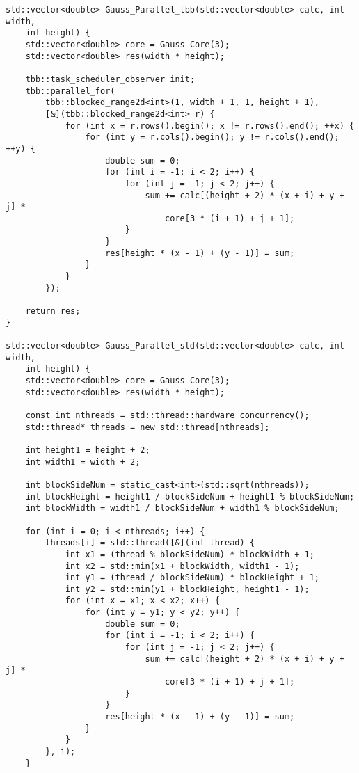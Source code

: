 \documentclass{report}
\begin{document}
\begin{lstlisting}
std::vector<double> Gauss_Parallel_tbb(std::vector<double> calc, int width,
    int height) {
    std::vector<double> core = Gauss_Core(3);
    std::vector<double> res(width * height);

    tbb::task_scheduler_observer init;
    tbb::parallel_for(
        tbb::blocked_range2d<int>(1, width + 1, 1, height + 1),
        [&](tbb::blocked_range2d<int> r) {
            for (int x = r.rows().begin(); x != r.rows().end(); ++x) {
                for (int y = r.cols().begin(); y != r.cols().end(); ++y) {
                    double sum = 0;
                    for (int i = -1; i < 2; i++) {
                        for (int j = -1; j < 2; j++) {
                            sum += calc[(height + 2) * (x + i) + y + j] *
                                core[3 * (i + 1) + j + 1];
                        }
                    }
                    res[height * (x - 1) + (y - 1)] = sum;
                }
            }
        });

    return res;
}

std::vector<double> Gauss_Parallel_std(std::vector<double> calc, int width,
    int height) {
    std::vector<double> core = Gauss_Core(3);
    std::vector<double> res(width * height);

    const int nthreads = std::thread::hardware_concurrency();
    std::thread* threads = new std::thread[nthreads];

    int height1 = height + 2;
    int width1 = width + 2;

    int blockSideNum = static_cast<int>(std::sqrt(nthreads));
    int blockHeight = height1 / blockSideNum + height1 % blockSideNum;
    int blockWidth = width1 / blockSideNum + width1 % blockSideNum;

    for (int i = 0; i < nthreads; i++) {
        threads[i] = std::thread([&](int thread) {
            int x1 = (thread % blockSideNum) * blockWidth + 1;
            int x2 = std::min(x1 + blockWidth, width1 - 1);
            int y1 = (thread / blockSideNum) * blockHeight + 1;
            int y2 = std::min(y1 + blockHeight, height1 - 1);
            for (int x = x1; x < x2; x++) {
                for (int y = y1; y < y2; y++) {
                    double sum = 0;
                    for (int i = -1; i < 2; i++) {
                        for (int j = -1; j < 2; j++) {
                            sum += calc[(height + 2) * (x + i) + y + j] *
                                core[3 * (i + 1) + j + 1];
                        }
                    }
                    res[height * (x - 1) + (y - 1)] = sum;
                }
            }
        }, i);
    }


\end{lstlisting}
\end{document}
